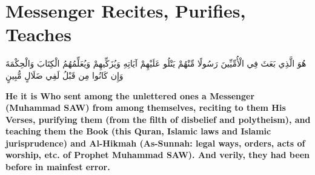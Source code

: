 \chapter{Messenger Recites, Purifies, Teaches}
\begin{center}
    {\Huge    
        \begin{Arabic}
            هُوَ الَّذِي بَعَثَ فِي الْأُمِّيِّينَ رَسُولًا مِّنْهُمْ يَتْلُو عَلَيْهِمْ آيَاتِهِ وَيُزَكِّيهِمْ وَيُعَلِّمُهُمُ الْكِتَابَ وَالْحِكْمَةَ وَإِن كَانُوا مِن قَبْلُ لَفِي ضَلَالٍ مُّبِينٍ
        \end{Arabic}
    }
\end{center}
\vspace*{\fill}
\vspace{3cm}
\begin{center}
    \large \textbf{He it is Who sent among the unlettered ones a Messenger (Muhammad SAW) from among themselves, reciting to them His Verses, purifying them (from the filth of disbelief and polytheism), and teaching them the Book (this Quran, Islamic laws and Islamic jurisprudence) and Al-Hikmah (As-Sunnah: legal ways, orders, acts of worship, etc. of Prophet Muhammad SAW). And verily, they had been before in mainfest error.}
\end{center}
